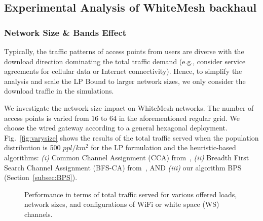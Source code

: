 \subsection{Experimental Analysis of WhiteMesh backhaul}
\label{subsec:wmanalysis}

\subsubsection{Network Size \& Bands Effect}

Typically, the traffic patterns of access points from users are diverse with
the download direction dominating the total traffic demand (e.g., consider
service agreements for cellular data or Internet connectivity). 
Hence, to simplify the analysis and scale the LP Bound to larger network 
sizes, we only consider the download traffic in the simulations.

We investigate the network size impact on WhiteMesh networks. 
The number of access points is varied from $16$ to $64$ in the aforementioned 
regular grid. 
We choose the wired gateway according to a general hexagonal deployment.
Fig.~\ref{fig:varysize} shows the results of the total traffic served 
when the population distribution is 500 $ppl/km^2$ 
for the LP formulation and the heuristic-based algorithms: 
{\it (i)} Common Channel Assignment (CCA) from~\cite{draves2004routing},
{\it (ii)} Breadth First Search Channel Assignment (BFS-CA) from~\cite{ramachandran2006interference},
AND {\it (iii)} our algorithm BPS (Section~\ref{subsec:BPS}).


\begin{figure}[t]
\centering
{}
\hfill
\caption{Performance in terms of total traffic served for various offered loads, network sizes, and configurations of WiFi or white space (WS) channels.}
\label{fig:all3figs}
\vspace{-0.3in}
\end{figure}


